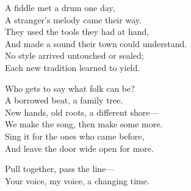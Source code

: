 \begin{lyrics}
A fiddle met a drum one day,\\
A stranger’s melody came their way.\\
They used the tools they had at hand,\\
And made a sound their town could understand.\\
No style arrived untouched or sealed;\\
Each new tradition learned to yield.

Who gets to say what folk can be?\\
A borrowed beat, a family tree.\\
New hands, old roots, a different shore—\\
We make the song, then make some more.\\
Sing it for the ones who came before,\\
And leave the door wide open for more.

Pull together, pass the line—\\
Your voice, my voice, a changing time.
\end{lyrics}
